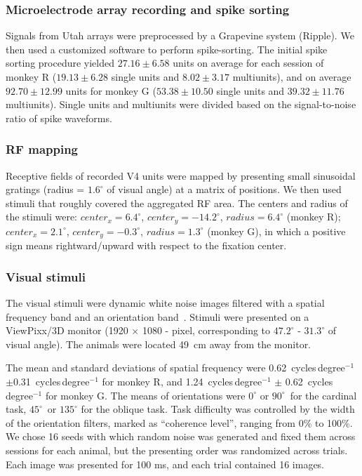 \documentclass[lineno,pdflatex,sn-basic]{sn-jnl}%
\theoremstyle{thmstyleone}%
\theoremstyle{thmstyletwo}%
\theoremstyle{thmstylethree}%
\begin{document}
\subsubsection{Microelectrode array recording and spike sorting}
Signals from Utah arrays were preprocessed by a Grapevine system (Ripple). We then used a customized software \citep{spikesorting_url} to perform spike-sorting. The initial spike sorting procedure yielded $27.16\pm6.58$ units on average for each session of monkey R ($19.13 \pm 6.28$ single units and $8.02 \pm3.17$ multiunits), and on average $92.70 \pm 12.99$ units for monkey G ($53.38 \pm 10.50$ single units and $39.32 \pm 11.76$ multiunits). Single units and multiunits were divided based on the signal-to-noise ratio of spike waveforms.

\subsubsection{RF mapping}
Receptive fields of recorded V4 units were mapped by presenting small sinusoidal gratings (radius = $1.6^\circ$ of visual angle) at a matrix of positions. We then used stimuli that roughly covered the aggregated RF area. The centers and radius of the stimuli were: $center_x = 6.4^\circ$, $center_y = -14.2^\circ$, $radius =  6.4^\circ$ (monkey R); $center_x = 2.1^\circ$, $center_y = -0.3^\circ$, $radius = 1.3^\circ$ (monkey G), in which a positive sign means rightward/upward with respect to the fixation center.

\subsubsection{Visual stimuli} 
The visual stimuli were dynamic white noise images filtered with a spatial frequency band and an orientation band~\citep{nienborg2014decision, bondy2018feedback, lange2023weak}. Stimuli were presented on a ViewPixx/3D monitor (1920 $\times$ 1080 - pixel, corresponding to $47.2^\circ$ - $31.3^\circ$ of visual angle). The animals were located 49~cm away from the monitor.

The mean and standard deviations of spatial frequency were 0.62~cycles\,degree$^{-1}$ $\pm $0.31~cycles\,degree$^{-1}$ for monkey R, and 1.24~cycles\,degree$^{-1}$ $\pm$ 0.62~cycles\,degree$^{-1}$ for monkey G. The means of orientations were $0^\circ$ or $90^\circ$\ for the cardinal task, $45^\circ$\ or $135^\circ$ for the oblique task. Task difficulty was controlled by the width of the orientation filters, marked as ``coherence level'', ranging from 0\% to 100\%. We chose 16 seeds with which random noise was generated and fixed them across sessions for each animal, but the presenting order was randomized across trials. Each image was presented for 100 ms, and each trial contained 16 images.
\end{document}

